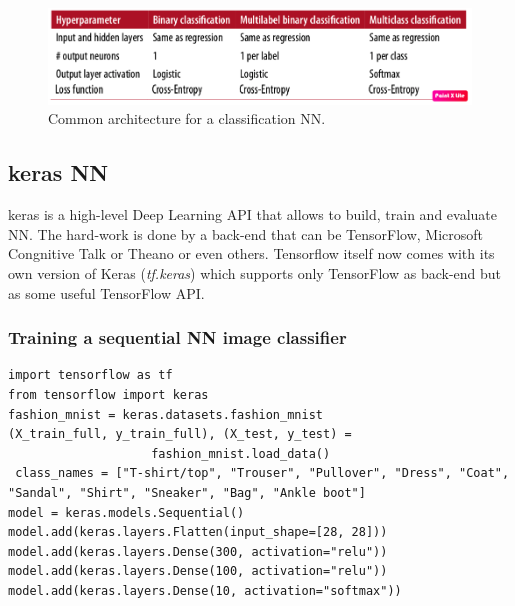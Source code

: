 \documentclass[12pt, letterpaper]{article}
\theoremstyle{definition}
\let\ti\textit
\begin{document}
\begin{figure}
\includegraphics[scale=0.4]{img/NNClassArchitecture}
\caption{Common architecture for a classification NN.}
\end{figure}

\subsection{keras NN}
keras is a high-level Deep Learning API that allows to build, train and evaluate NN. The hard-work is done by a back-end that can be TensorFlow, Microsoft Congnitive Talk or Theano or even others. Tensorflow itself now comes with its own version of Keras (\ti{tf.keras}) which supports only TensorFlow as back-end but as some useful TensorFlow API.

\subsubsection{Training a sequential NN image classifier}
\begin{lstlisting}
import tensorflow as tf
from tensorflow import keras
fashion_mnist = keras.datasets.fashion_mnist
(X_train_full, y_train_full), (X_test, y_test) = 
					fashion_mnist.load_data()
 class_names = ["T-shirt/top", "Trouser", "Pullover", "Dress", "Coat", "Sandal", "Shirt", "Sneaker", "Bag", "Ankle boot"]
model = keras.models.Sequential()
model.add(keras.layers.Flatten(input_shape=[28, 28]))
model.add(keras.layers.Dense(300, activation="relu"))
model.add(keras.layers.Dense(100, activation="relu"))
model.add(keras.layers.Dense(10, activation="softmax"))
\end{lstlisting}
\end{document}
